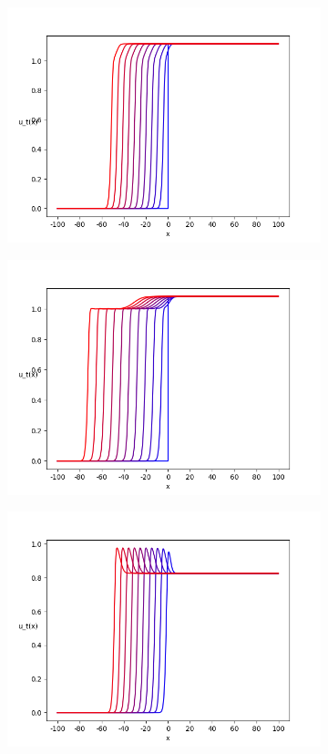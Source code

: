 \documentclass{article}
\theoremstyle{definition}
\numberwithin{equation}{section}
\begin{document}
\begin{figure}
\begin{subfigure}[b]{0.45\textwidth}
      \includegraphics[width=\textwidth]{figures/fig3b.png}
      \caption{}
  \end{subfigure}
  \begin{subfigure}[b]{0.45\textwidth}
    \centering
    \includegraphics[width=\textwidth]{figures/fig3e.png}
    \caption{}
\end{subfigure}
\begin{subfigure}[b]{0.45\textwidth}
  \centering
  \includegraphics[width=\textwidth]{figures/fig3c.png}

\end{subfigure}
\end{figure}
\end{document}
